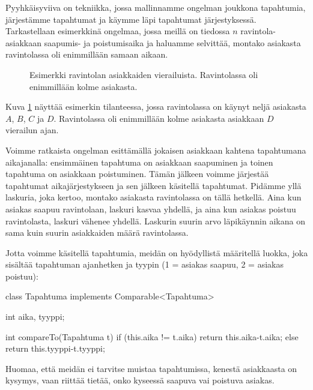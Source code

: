 Pyyhkäisyviiva on tekniikka, jossa mallinnamme ongelman joukkona
tapahtumia, järjestämme tapahtumat ja käymme läpi tapahtumat
järjestyksessä.
Tarkastellaan esimerkkinä ongelmaa, jossa meillä on tiedossa
$n$ ravintola-asiakkaan saapumis- ja poistumisaika
ja haluamme selvittää, montako asiakasta ravintolassa oli
enimmillään samaan aikaan.

\begin{figure}
\center
{}
\caption{Esimerkki ravintolan asiakkaiden vierailuista.
Ravintolassa oli enimmillään kolme asiakasta.}
\label{fig:pyyvii}
\end{figure}

Kuva \ref{fig:pyyvii} näyttää esimerkin tilanteessa,
jossa ravintolassa on käynyt neljä asiakasta $A$, $B$, $C$ ja $D$.
Ravintolassa oli enimmillään kolme asiakasta
asiakkaan $D$ vierailun ajan.

Voimme ratkaista ongelman esittämällä jokaisen asiakkaan kahtena
tapahtumana aikajanalla: ensimmäinen tapahtuma on asiakkaan
saapuminen ja toinen tapahtuma on asiakkaan poistuminen.
Tämän jälkeen voimme järjestää tapahtumat aikajärjestykseen
ja sen jälkeen käsitellä tapahtumat.
Pidämme yllä laskuria, joka kertoo, montako asiakasta ravintolassa
on tällä hetkellä.
Aina kun asiakas saapuu ravintolaan, laskuri kasvaa yhdellä,
ja aina kun asiakas poistuu ravintolasta,
laskuri vähenee yhdellä.
Laskurin suurin arvo läpikäynnin aikana on sama kuin
suurin asiakkaiden määrä ravintolassa.

Jotta voimme käsitellä tapahtumia, meidän on hyödyllistä määritellä
luokka, joka sisältää tapahtuman ajanhetken ja tyypin
(1 = asiakas saapuu, 2 = asiakas poistuu):

\begin{code}
class Tapahtuma implements Comparable<Tapahtuma> {
    int aika, tyyppi;

    int compareTo(Tapahtuma t) {
        if (this.aika != t.aika) return this.aika-t.aika;
        else return this.tyyppi-t.tyyppi;
    }
}
\end{code}

Huomaa, että meidän ei tarvitse muistaa tapahtumissa,
kenestä asiakkaasta on kysymys, vaan riittää tietää,
onko kyseessä saapuva vai poistuva asiakas.

